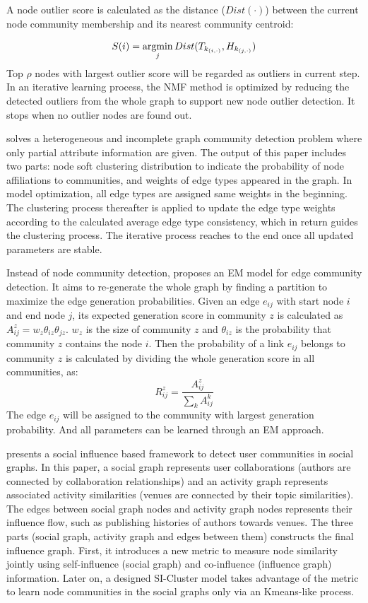 A node outlier score is calculated as the distance ($Dist(\cdot)$) between the current node community membership and its nearest community centroid:

\begin{equation}
S(i) =  \operatorname*{argmin}_{j} Dist(T_{k_{(i,\cdot)}}, H_{k_{(j,\cdot)}})
\end{equation} 
Top $\rho$ nodes with largest outlier score will be regarded as outliers in current step. In an iterative learning process, the NMF method is optimized by reducing the detected outliers from the whole graph to support new node outlier detection. It stops when no outlier nodes are found out.

\cite{sun2012relation} solves a heterogeneous and incomplete graph community detection problem where only partial attribute information are given. The output of this paper includes two parts: node soft clustering distribution to indicate the probability of node affiliations to communities, and weights of edge types appeared in the graph. In model optimization, all edge types are assigned same weights in the beginning. The clustering process thereafter is applied to update the edge type weights according to the calculated average edge type consistency, which in return  guides the clustering process. The iterative process reaches to the end once all updated parameters are stable. 

Instead of node community detection, \cite{he2015stochastic} proposes an EM model for edge community detection. It aims to re-generate the whole graph by finding a partition to maximize the edge generation probabilities. Given an edge $e_{ij}$ with start node $i$ and end node $j$, its expected generation score in community $z$ is calculated as $A_{ij}^{z} = w_z\theta_{iz}\theta_{jz}$. $w_z$ is the size of community $z$ and $\theta_{iz}$ is the probability that community $z$ contains the node $i$. Then the probability of a link $e_{ij}$ belongs to community $z$ is calculated by dividing the whole generation score in all communities, as:
\begin{equation}
	R_{ij}^z = \frac{A_{ij}^{z} }{\sum_{k}{A_{ij}^{k} }}
\end{equation}
The edge $e_{ij}$ will be assigned to the community with largest generation probability. And all parameters can be learned through an EM approach.

\cite{zhou2013social} presents a social influence based framework to detect user communities in social graphs. In this paper, a social graph represents user collaborations (authors are connected by collaboration relationships) and an activity graph represents associated activity similarities (venues are connected by their topic similarities). The edges between social graph nodes and activity graph nodes represents their influence flow, such as publishing histories of authors towards venues. The three parts (social graph, activity graph and edges between them) constructs the final influence graph. First, it introduces  a new metric to  measure node similarity jointly using self-influence (social graph) and co-influence (influence graph) information. Later on, a designed SI-Cluster model takes advantage of the metric to learn node communities in the social graphs only via an Kmeans-like process. 

